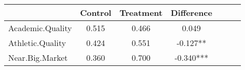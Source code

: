 \begin{tabular}{l*{6}{c}}
                    &     Control&   Treatment&  Difference   \\
\hline
Academic.Quality    &       0.515&       0.466&       0.049   \\
Athletic.Quality    &       0.424&       0.551&      -0.127** \\
Near.Big.Market     &       0.360&       0.700&      -0.340***\\
\end{tabular}
